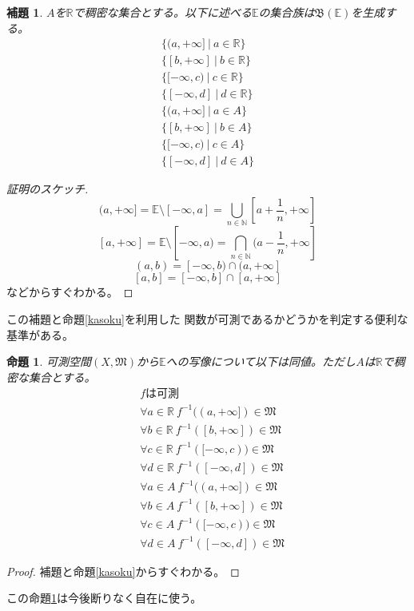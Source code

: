 \documentclass[leqno]{jsarticle}
\newtheorem{prop}[thm]{命題}
\newtheorem{lem}[thm]{補題}
\newcommand{\nn}{\mathbb{N}}
\newcommand{\rr}{\mathbb{R}}
\newcommand{\mgn}{\infty}
\newcommand{\mm}{\mathfrak{M}}
\newcommand{\rrr}{\mathbb{E}}
\begin{document}
\setcounter{equation}{0}
\begin{lem}
$A$を$\rr$で稠密な集合とする。以下に述べる$\rrr$の集合族は$\mathfrak{B}(\rrr)$を生成する。
\begin{eqnarray}
\{(a,+\mgn]\ |\ a\in \rr\}\\ 
\{[b,+\mgn]\ |\ b\in \rr\}\\
\{[-\mgn,c)\ |\ c\in \rr\}\\  
\{[-\mgn,d]\ |\ d\in \rr\}\\
\{(a,+\mgn]\ |\ a\in A\}\\ 
\{[b,+\mgn]\ |\ b\in A\}\\
\{[-\mgn,c)\ |\ c\in A\}\\  
\{[-\mgn,d]\ |\ d\in A\}
\end{eqnarray}
\end{lem}
\begin{proof}[証明のスケッチ]
\[
(a,+\mgn]=\rrr\setminus [-\mgn,a]=\bigcup_{n\in\nn}[a+\frac{1}{n},+\mgn]
\]
\[
[a,+\mgn]=\rrr\setminus [-\mgn,a)=\bigcap_{n\in\nn}(a-\frac{1}{n},+\mgn]
\]
\[
(a,b)=[-\mgn,b)\cap (a,+\mgn]
\]
\[
[a,b]=[-\mgn,b]\cap [a,+\mgn]
\]
などからすぐわかる。
\end{proof}

この補題と命題\ref{kasoku}を利用した
関数が可測であるかどうかを判定する便利な基準がある。

\setcounter{equation}{0}
\begin{prop}\label{aa}可測空間$(X,\mm)$から$\rrr$への写像について以下は同値。ただし$A$は$\rr$で稠密な集合とする。
\begin{eqnarray}
&fは可測\\ 
&\forall a\in \rr\ f^{-1}((a,+\mgn])\in \mm\\ 
&\forall b\in \rr\ f^{-1}([b,+\mgn])\in \mm\\
&\forall c\in \rr\ f^{-1}([-\mgn,c))\in \mm\\
&\forall d\in \rr\ f^{-1}([-\mgn,d])\in \mm\\ 
&\forall a\in A\ f^{-1}((a,+\mgn])\in \mm\\ 
&\forall b\in A\ f^{-1}([b,+\mgn])\in \mm\\
&\forall c\in A\ f^{-1}([-\mgn,c))\in \mm\\
&\forall d\in A\ f^{-1}([-\mgn,d])\in \mm
\end{eqnarray}
\end{prop}
\begin{proof}補題と命題\ref{kasoku}からすぐわかる。
\end{proof}
この命題\ref{aa}は今後断りなく自在に使う。
\end{document}
